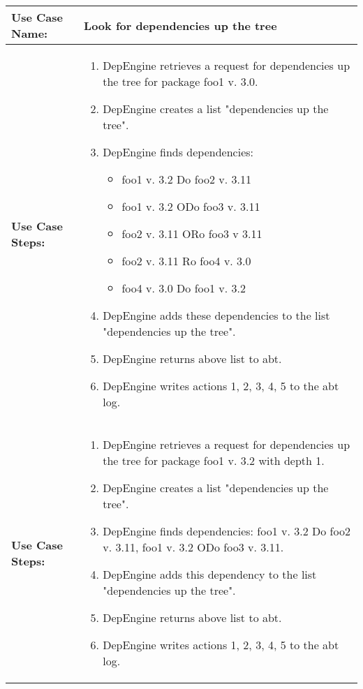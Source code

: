 
\begin{tabularx}{\linewidth}{|l|X|}
\hline
\textbf{Use Case Name:} & \textbf{Look for dependencies up the tree} \\
\hline
\textbf{Use Case Steps:} & 
\begin{minipage}{\linewidth} 
 \vspace{0.05em}
  \begin{enumerate}
   \item DepEngine retrieves a request for dependencies up the tree for package foo1 v. 3.0.
   \item DepEngine creates a list "dependencies up the tree".
   \item DepEngine finds dependencies:
   \begin{itemize}
      \item foo1 v. 3.2 Do foo2 v. 3.11
      \item foo1 v. 3.2 ODo foo3 v. 3.11
      \item foo2 v. 3.11 ORo foo3 v 3.11
      \item foo2 v. 3.11 Ro foo4 v. 3.0
      \item foo4 v. 3.0 Do foo1 v. 3.2
   \end{itemize}
   \item DepEngine adds these dependencies to the list "dependencies up the tree".
   \item DepEngine returns above list to abt.
   \item DepEngine writes actions 1, 2, 3, 4, 5 to the abt log.
  \end{enumerate}
 \vspace{0.05em}
\end{minipage}
\\
\hline 
\textbf{Use Case Steps:} & 
\begin{minipage}{\linewidth} 
 \vspace{0.05em}
  \begin{enumerate}
   \item DepEngine retrieves a request for dependencies up the tree for package foo1 v. 3.2 with depth 1. 
   \item DepEngine creates a list "dependencies up the tree".
   \item DepEngine finds dependencies: foo1 v. 3.2 Do foo2 v. 3.11, foo1 v. 3.2 ODo foo3 v. 3.11.
   \item DepEngine adds this dependency to the list "dependencies up the tree".
   \item DepEngine returns above list to abt.
   \item DepEngine writes actions 1, 2, 3, 4, 5 to the abt log.
  \end{enumerate}
 \vspace{0.05em}
\end{minipage}
\\
\hline 
\end{tabularx}
